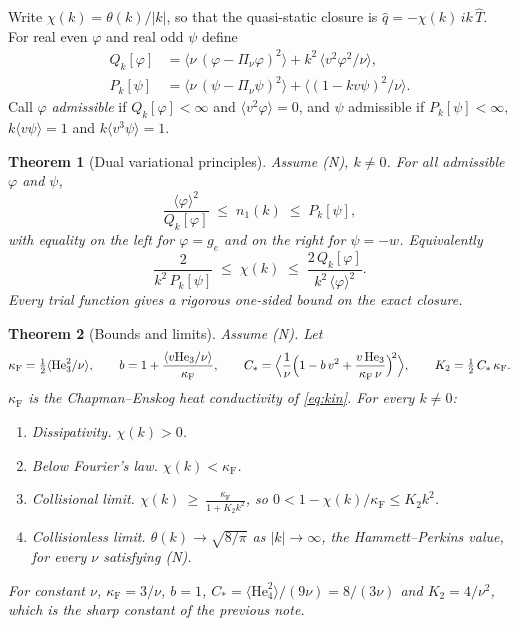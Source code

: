 \documentclass[11pt]{article}
\newcommand{\He}{\mathrm{He}}
\newcommand{\avg}[1]{\langle #1\rangle}
\newtheorem{theorem}{Theorem}
\theoremstyle{remark}
\begin{document}
Write $\chi(k) = \theta(k)/|k|$, so that the quasi-static closure is
$\hat q = -\chi(k)\,ik\,\hat T$. For real even $\varphi$ and real odd $\psi$
define
\begin{align}
  Q_k[\varphi] &= \avg{\nu\,(\varphi-\Pi_\nu\varphi)^2}
     + k^2\,\avg{v^2\varphi^2/\nu}, \\
  P_k[\psi] &= \avg{\nu\,(\psi-\Pi_\nu\psi)^2}
     + \avg{(1-kv\psi)^2/\nu}.
\end{align}
Call $\varphi$ \emph{admissible} if $Q_k[\varphi]<\infty$ and
$\avg{v^2\varphi}=0$, and $\psi$ admissible if $P_k[\psi]<\infty$,
$k\avg{v\psi}=1$ and $k\avg{v^3\psi}=1$.

\begin{theorem}[Dual variational principles]\label{thm:var}
Assume (N), $k\ne0$. For all admissible $\varphi$ and $\psi$,
\begin{equation}
  \frac{\avg{\varphi}^2}{Q_k[\varphi]} \;\le\; n_1(k) \;\le\; P_k[\psi],
  \label{eq:dual}
\end{equation}
with equality on the left for $\varphi = g_e$ and on the right for
$\psi=-w$. Equivalently
\begin{equation}
  \frac{2}{k^2\,P_k[\psi]} \;\le\; \chi(k) \;\le\;
  \frac{2\,Q_k[\varphi]}{k^2\,\avg{\varphi}^2}.
\end{equation}
Every trial function gives a rigorous one-sided bound on the exact closure.
\end{theorem}

\begin{theorem}[Bounds and limits]\label{thm:bounds}
Assume (N). Let
\begin{equation}
  \kappa_{\mathrm F} = \tfrac12\avg{\He_3^2/\nu},\qquad
  b = 1 + \frac{\avg{v\He_3/\nu}}{\kappa_{\mathrm F}},\qquad
  C_* = \Bigl\langle\frac1\nu\Bigl(1 - b\,v^2
        + \frac{v\,\He_3}{\kappa_{\mathrm F}\,\nu}\Bigr)^{\!2}\Bigr\rangle,
  \qquad K_2 = \tfrac12\,C_*\,\kappa_{\mathrm F}.
\end{equation}
$\kappa_{\mathrm F}$ is the Chapman--Enskog heat conductivity of
\eqref{eq:kin}. For every $k\ne0$:
\begin{enumerate}
  \item[(a)] \emph{Dissipativity.} $\chi(k)>0$.
  \item[(b)] \emph{Below Fourier's law.} $\chi(k)<\kappa_{\mathrm F}$.
  \item[(c)] \emph{Collisional limit.}
    $\displaystyle \chi(k)\ \ge\ \frac{\kappa_{\mathrm F}}{1+K_2k^2}$, so
    $0 < 1-\chi(k)/\kappa_{\mathrm F}\le K_2k^2$.
  \item[(d)] \emph{Collisionless limit.}
    $\theta(k)\to\sqrt{8/\pi}$ as $|k|\to\infty$, the Hammett--Perkins
    value, for every $\nu$ satisfying (N).
\end{enumerate}
For constant $\nu$, $\kappa_{\mathrm F} = 3/\nu$, $b=1$,
$C_* = \avg{\He_4^2}/(9\nu) = 8/(3\nu)$ and $K_2 = 4/\nu^2$, which is the
sharp constant of the previous note.
\end{theorem}
\end{document}
